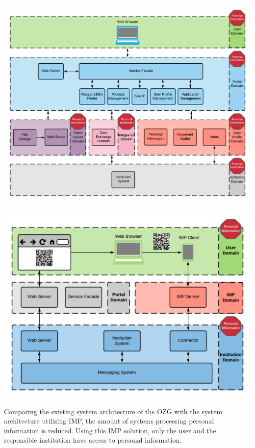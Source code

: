 \begin{center}
    \includegraphics[scale=0.6]{Diagrams/Integration Architecture 2/OZG Personal Information.pdf}
\end{center}

\begin{center}
    \includegraphics[scale=0.6]{Diagrams/Integration Architecture 2/IMP Personal Information.pdf}
\end{center}

Comparing the existing system architecture of the OZG with the system architecture utilizing IMP, the amount of systems processing personal information is reduced. Using this IMP solution, only the user and the responsible institution have access to personal information.

